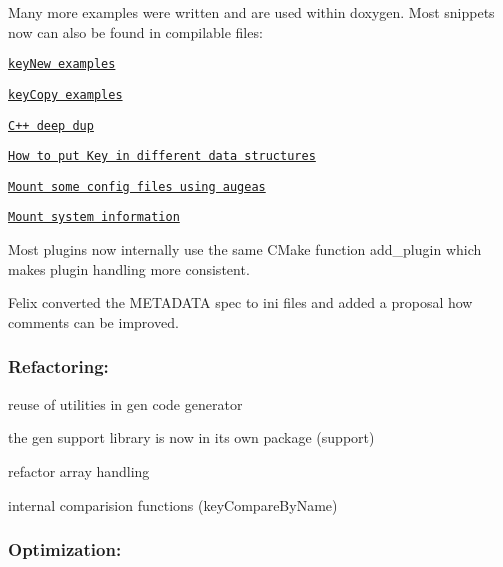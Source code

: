 Many more examples were written and are used within doxygen. Most snippets now can also be found in compilable files\+:


\begin{DoxyItemize}
\item \href{https://github.com/ElektraInitiative/libelektra/tree/master/examples/keyNew.c}{\tt key\+New examples}
\item \href{https://github.com/ElektraInitiative/libelektra/tree/master/examples/keyCopy.c}{\tt key\+Copy examples}
\item \href{https://github.com/ElektraInitiative/libelektra/tree/master/src/bindings/cpp/examples/cpp_example_dup.cpp}{\tt C++ deep dup}
\item \href{https://github.com/ElektraInitiative/libelektra/tree/master/src/bindings/cpp/examples/cpp_example_ordering.cpp}{\tt How to put Key in different data structures}
\item \href{https://github.com/ElektraInitiative/libelektra/tree/master/scripts/mount-augeas}{\tt Mount some config files using augeas}
\item \href{https://github.com/ElektraInitiative/libelektra/tree/master/scripts/mount-info}{\tt Mount system information}
\end{DoxyItemize}

Most plugins now internally use the same C\+Make function {\ttfamily add\+\_\+plugin} which makes plugin handling more consistent.

Felix converted the M\+E\+T\+A\+D\+A\+TA spec to ini files and added a proposal how comments can be improved.

\subsubsection*{Refactoring\+:}


\begin{DoxyItemize}
\item reuse of utilities in gen code generator
\item the gen support library is now in its own package ({\ttfamily support})
\item refactor array handling
\item internal comparision functions (key\+Compare\+By\+Name)
\end{DoxyItemize}

\subsubsection*{Optimization\+:}


